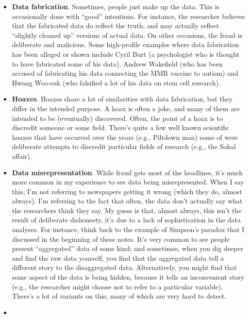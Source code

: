\documentclass[]{book}
\begin{document}
\begin{itemize}
\item
  \textbf{Data fabrication}. Sometimes, people just make up the data. This is occasionally done with ``good'' intentions. For instance, the researcher believes that the fabricated data do reflect the truth, and may actually reflect ``slightly cleaned up'' versions of actual data. On other occasions, the fraud is deliberate and malicious. Some high-profile examples where data fabrication has been alleged or shown include Cyril Burt (a psychologist who is thought to have fabricated some of his data), Andrew Wakefield (who has been accused of fabricating his data connecting the MMR vaccine to autism) and Hwang Woo-suk (who falsified a lot of his data on stem cell research).
\item
  \textbf{Hoaxes}. Hoaxes share a lot of similarities with data fabrication, but they differ in the intended purpose. A hoax is often a joke, and many of them are intended to be (eventually) discovered. Often, the point of a hoax is to discredit someone or some field. There's quite a few well known scientific hoaxes that have occurred over the years (e.g., Piltdown man) some of were deliberate attempts to discredit particular fields of research (e.g., the Sokal affair).
\item
  \textbf{Data misrepresentation}. While fraud gets most of the headlines, it's much more common in my experience to see data being misrepresented. When I say this, I'm not referring to newspapers getting it wrong (which they do, almost always). I'm referring to the fact that often, the data don't actually say what the researchers think they say. My guess is that, almost always, this isn't the result of deliberate dishonesty, it's due to a lack of sophistication in the data analyses. For instance, think back to the example of Simpson's paradox that I discussed in the beginning of these notes. It's very common to see people present ``aggregated'' data of some kind; and sometimes, when you dig deeper and find the raw data yourself, you find that the aggregated data tell a different story to the disaggregated data. Alternatively, you might find that some aspect of the data is being hidden, because it tells an inconvenient story (e.g., the researcher might choose not to refer to a particular variable). There's a lot of variants on this; many of which are very hard to detect.
\item

\end{itemize}
\end{document}
